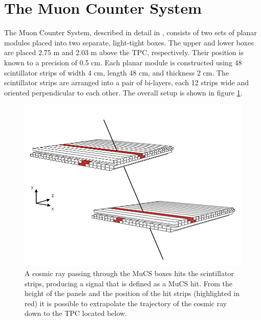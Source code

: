 \documentclass[a4paper,11pt]{article}
\begin{document}

\section{The Muon Counter System}\label{sec:proc}
The Muon Counter System, described in detail in \cite{mucs}, consists of two sets of planar modules placed into two separate, light-tight boxes. The upper and lower boxes are placed 2.75 m and 2.03 m above the TPC, respectively. Their position is known to a precision of 0.5 cm. Each planar module is constructed using 48 scintillator strips of width 4 cm, length 48 cm, and thickness 2 cm. The scintillator strips are arranged into a pair of bi-layers, each 12 strips wide and oriented perpendicular to each other. The overall setup is shown in figure \ref{fig:boxes}.

\begin{figure}[htbp]
  \begin{center}
    \includegraphics[width=0.7\linewidth]{figures/boxes.png}
    \caption{A cosmic ray passing through the MuCS boxes hits the scintillator strips, producing a signal that is defined as a MuCS hit. From the height of the panels and the position of the hit strips (highlighted in red) it is possible to extrapolate the trajectory of the cosmic ray down to the TPC located below.} \label{fig:boxes}
  \end{center}
\end{figure}
\end{document}
